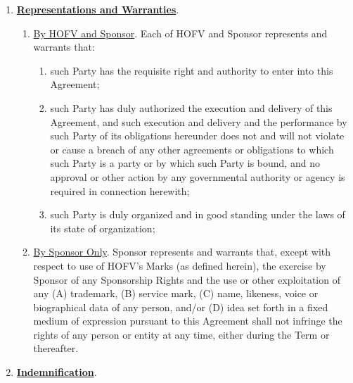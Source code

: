 \documentclass{article}
\begin{document}
\begin{enumerate}
\def\labelenumi{\arabic{enumi}.}
\setcounter{enumi}{7}
\item
  \textbf{\uline{Representations and Warranties}}.

  \begin{enumerate}
  \def\labelenumii{\arabic{enumii}.}
  \item
    \uline{By HOFV and Sponsor}. Each of HOFV and Sponsor represents and
    warrants that:

    \begin{enumerate}
    \def\labelenumiii{\alph{enumiii}.}
    \item
      such Party has the requisite right and authority to enter into
      this Agreement;
    \item
      such Party has duly authorized the execution and delivery of this
      Agreement, and such execution and delivery and the performance by
      such Party of its obligations hereunder does not and will not
      violate or cause a breach of any other agreements or obligations
      to which such Party is a party or by which such Party is bound,
      and no approval or other action by any governmental authority or
      agency is required in connection herewith;
    \item
      such Party is duly organized and in good standing under the laws
      of its state of organization;
    \end{enumerate}
  \item
    \uline{By Sponsor Only}. Sponsor represents and warrants that,
    except with respect to use of HOFV's Marks (as defined herein), the
    exercise by Sponsor of any Sponsorship Rights and the use or other
    exploitation of any (A) trademark, (B) service mark, (C) name,
    likeness, voice or biographical data of any person, and/or (D) idea
    set forth in a fixed medium of expression pursuant to this Agreement
    shall not infringe the rights of any person or entity at any time,
    either during the Term or thereafter.
  \end{enumerate}
\item
  \textbf{\uline{Indemnification}}.


\end{enumerate}
\end{document}
